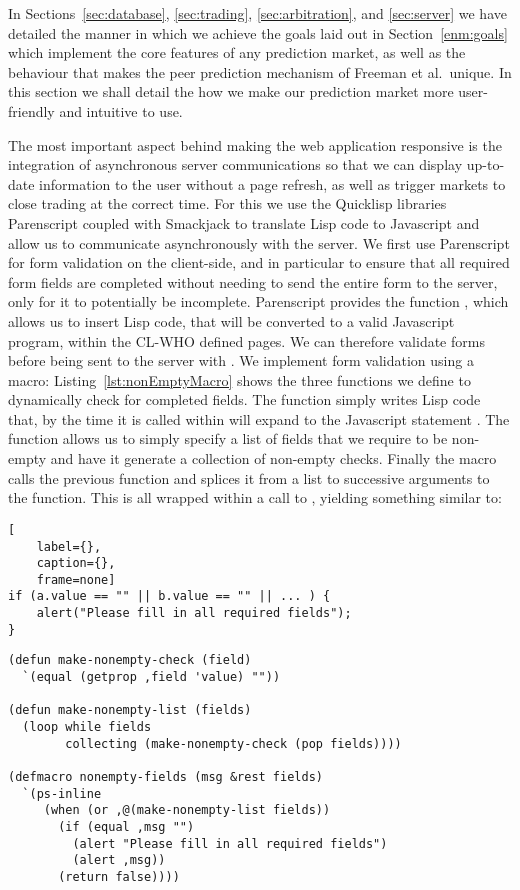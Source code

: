 In Sections~\ref{sec:database}, \ref{sec:trading}, \ref{sec:arbitration}, and
\ref{sec:server} we have detailed the manner in which we achieve the goals laid
out in Section~\ref{enm:goals} which implement the core features of any
prediction market, as well as the behaviour that makes the peer prediction
mechanism of Freeman et al.\ unique. In this section we shall detail the how we
make our prediction market more user-friendly and intuitive to use.

The most important aspect behind making the web application responsive is the
integration of asynchronous server communications so that we can display
up-to-date information to the user without a page refresh, as well as trigger
markets to close trading at the correct time. For this we use the Quicklisp
libraries Parenscript coupled with Smackjack to translate Lisp code to
Javascript and allow us to communicate asynchronously with the server. We first
use Parenscript for form validation on the client-side, and in particular to
ensure that all required form fields are completed without needing to send the
entire form to the server, only for it to potentially be incomplete.
Parenscript provides the function , which allows us to insert
Lisp code, that will be converted to a valid Javascript program, within the
CL-WHO defined pages. We can therefore validate forms before being sent to the
server with . We implement form validation using a macro:
Listing~\ref{lst:nonEmptyMacro} shows the three functions we define to
dynamically check for completed fields. The function 
simply writes Lisp code that, by the time it is called within 
will expand to the Javascript statement . The function
 allows us to simply specify a list of fields that we
require to be non-empty and have it generate a collection of non-empty checks.
Finally the macro  calls the previous function and
splices it from a list to successive arguments to the  function. This
is all wrapped within a call to , yielding something similar
to:

\begin{lstlisting}[
	label={},
	caption={},
	frame=none]
if (a.value == "" || b.value == "" || ... ) {
    alert("Please fill in all required fields");
}
\end{lstlisting}

\begin{lstlisting}[float,
	label={lst:nonEmptyMacro},
	caption={Macro for ensuring all required fields are complete}]
(defun make-nonempty-check (field)
  `(equal (getprop ,field 'value) ""))

(defun make-nonempty-list (fields)
  (loop while fields
        collecting (make-nonempty-check (pop fields))))

(defmacro nonempty-fields (msg &rest fields)
  `(ps-inline
     (when (or ,@(make-nonempty-list fields))
       (if (equal ,msg "")
         (alert "Please fill in all required fields")
         (alert ,msg))
       (return false))))
\end{lstlisting}

